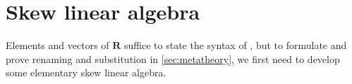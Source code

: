 \documentclass[submission,copyright,creativecommons]{eptcs}
\begin{document}
\begin{figure}[t]
\end{figure}

\section{Skew linear algebra}

Elements and vectors of $\mathbf R$ suffice to state the syntax of
\name{}, but to formulate and prove renaming and substitution in
\autoref{sec:metatheory}, we first need to develop some elementary
skew linear algebra.
\end{document}

